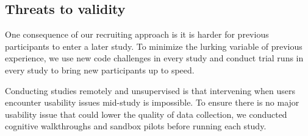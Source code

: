 \subsection{Threats to validity}



One consequence of our recruiting approach is it is harder for previous participants to enter a later study. To minimize the lurking variable of previous experience, we use new code challenges in every study and conduct trial runs in every study to bring new participants up to speed.

Conducting studies remotely and unsupervised is that intervening when users encounter usability issues mid-study is impossible. To ensure there is no major usability issue that could lower the quality of data collection, we conducted cognitive walkthroughs and sandbox pilots before running each study.